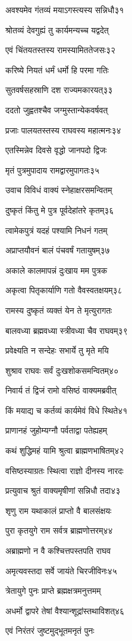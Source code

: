अवश्यमेव गंतव्यं मयाऽगस्त्यस्य सन्निधौ३१

श्रोतव्यं देवगुह्यं तु कार्यमन्यच्च यद्वदेत्

एवं चिंतयतस्तस्य रामस्यामिततेजसः३२

करिष्ये नियतं धर्मं धर्मो हि परमा गतिः

सुतवर्षसहस्राणि दश राज्यमकारयत्३३

ददतो जुह्वतश्चैव जग्मुस्तान्येकवर्षवत्

प्रजाः पालयतस्तस्य राघवस्य महात्मनः३४

एतस्मिन्नेव दिवसे वृद्धो जानपदो द्विजः

मृतं पुत्रमुपादाय रामद्वारमुपागतः३५

उवाच विविधं वाक्यं स्नेहाक्षरसमन्वितम्

दुष्कृतं किंतु मे पुत्र पूर्वदेहांतरे कृतम्३६

त्वामेकपुत्रं यदहं पश्यामि निधनं गतम्

अप्राप्तयौवनं बालं पंचवर्षं गतायुषम्३७

अकाले कालमापन्नं दुःखाय मम पुत्रक

अकृत्वा पितृकार्याणि गतो वैवस्वतक्षयम्३८

रामस्य दुष्कृतं व्यक्तं येन ते मृत्युरागतः

बालवध्या ब्रह्मवध्या स्त्रीवध्या चैव राघवम्३९

प्रवेक्ष्यति न सन्देहः सभार्ये तु मृते मयि

शुश्राव राघवः सर्वं दुःखशोकसमन्वितम्४०

निवार्य तं द्विजं रामो वसिष्ठं वाक्यमब्रवीत्

किं मयाद्य च कर्तव्यं कार्यमेवं विधे स्थिते४१

प्राणानहं जुहोम्यग्नौ पर्वताद्वा पतेह्यहम्

कथं शुद्धिमहं यामि श्रुत्वा ब्राह्मणभाषितम्४२

वसिष्ठस्याग्रतः स्थित्वा राज्ञो दीनस्य नारदः

प्रत्युवाच श्रुतं वाक्यमृषीणां सन्निधौ तदा४३

शृणु राम यथाकालं प्राप्तो वै बालसंक्षयः

पुरा कृतयुगे राम सर्वत्र ब्राह्मणोत्तरम्४४

अब्राह्मणो न वै कश्चित्तपस्तपति राघव

अमृत्यवस्तदा सर्वे जायंते चिरजीविनः४५

त्रेतायुगे पुनः प्राप्ते ब्रह्मक्षत्रमनुत्तमम्

अधर्मो द्वापरे तेषां वैश्यान्शूद्रांस्तथाविशत्४६

एवं निरंतरं जुष्टमुद्भूतमनृतं पुनः

